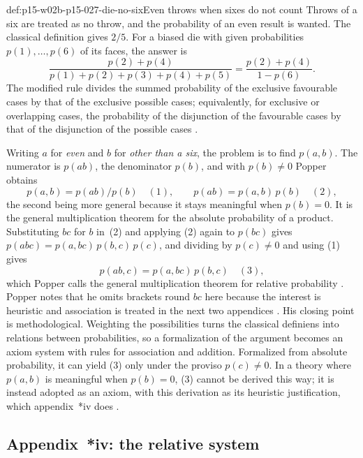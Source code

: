 \begin{hbexample}{def:p15-w02b-p15-027-die-no-six}{Even throws when sixes do not count}
Throws of a six are treated as no throw, and the probability of an even
result is wanted. The classical definition gives \(2/5\). For a biased
die with given probabilities \(p(1),\ldots,p(6)\) of its faces, the
answer is
\[
 \frac{p(2)+p(4)}{p(1)+p(2)+p(3)+p(4)+p(5)}=\frac{p(2)+p(4)}{1-p(6)}.
\]
The modified rule divides the summed probability of the exclusive
favourable cases by that of the exclusive possible cases; equivalently,
for exclusive or overlapping cases, the probability of the disjunction of
the favourable cases by that of the disjunction of the possible cases
\parencite[appendix~*iii, p.~326]{Popper2002LogicDiscoveryUI}.
\end{hbexample}

Writing \(a\) for \emph{even} and \(b\) for \emph{other than a six}, the
problem is to find \(p(a,b)\). The numerator is \(p(ab)\), the
denominator \(p(b)\), and with \(p(b)\neq0\) Popper obtains
\[
 p(a,b)=p(ab)/p(b)\quad(1),\qquad p(ab)=p(a,b)\,p(b)\quad(2),
\]
the second being more general because it stays meaningful when
\(p(b)=0\). It is the general multiplication theorem for the absolute
probability of a product. Substituting \(bc\) for \(b\) in~(2) and
applying (2) again to \(p(bc)\) gives
\(p(abc)=p(a,bc)\,p(b,c)\,p(c)\), and dividing by \(p(c)\neq0\) and using
(1) gives
\[
 p(ab,c)=p(a,bc)\,p(b,c)\quad(3),
\]
which Popper calls the general multiplication theorem for relative
probability \parencite[appendix~*iii, pp.~326--327]{Popper2002LogicDiscoveryUI}.
Popper notes that he omits brackets round \(bc\) here because the
interest is heuristic and association is treated in the next two
appendices \parencite[appendix~*iii, note~1, p.~327]{Popper2002LogicDiscoveryUI}.
His closing point is methodological. Weighting the possibilities turns the
classical definiens into relations between probabilities, so a
formalization of the argument becomes an axiom system with rules for
association and addition. Formalized from absolute probability, it can
yield (3) only under the proviso \(p(c)\neq0\). In a theory where
\(p(a,b)\) is meaningful when \(p(b)=0\), (3) cannot be derived this way;
it is instead adopted as an axiom, with this derivation as its heuristic
justification, which appendix~*iv does
\parencite[appendix~*iii, point~(7), p.~328]{Popper2002LogicDiscoveryUI}.

\subsection{Appendix~*iv: the relative system}

